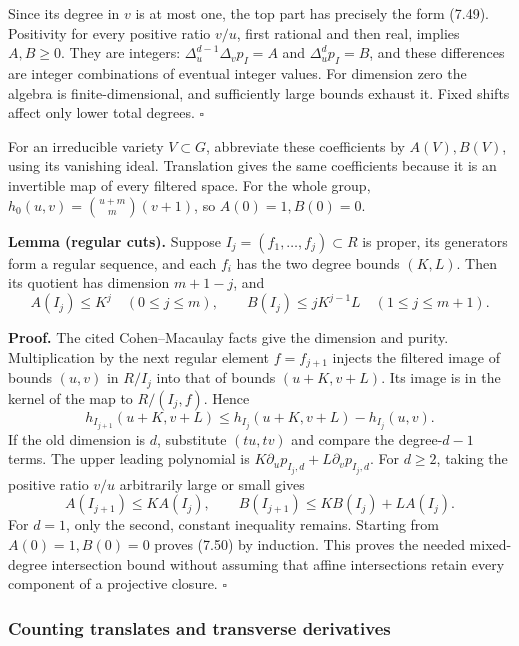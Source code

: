 \documentclass[
  11pt,
  a4paper,
]{article}
\begin{document}
Since its degree in \(v\) is at most one, the top part has precisely the
form (7.49). Positivity for every positive ratio \(v/u\), first rational
and then real, implies \(A,B\ge0\). They are integers:
\(\Delta_u^{d-1}\Delta_v p_I=A\) and \(\Delta_u^d p_I=B\), and these
differences are integer combinations of eventual integer values. For
dimension zero the algebra is finite-dimensional, and sufficiently large
bounds exhaust it. Fixed shifts affect only lower total degrees.
\(\square\)

For an irreducible variety \(V\subset G\), abbreviate these coefficients
by \(A(V),B(V)\), using its vanishing ideal. Translation gives the same
coefficients because it is an invertible map of every filtered space.
For the whole group, \(h_0(u,v)=\binom{u+m}{m}(v+1)\), so
\(A(0)=1,B(0)=0\).

\textbf{Lemma (regular cuts).} Suppose \(I_j=(f_1,\ldots,f_j)\subset R\)
is proper, its generators form a regular sequence, and each \(f_i\) has
the two degree bounds \((K,L)\). Then its quotient has dimension
\(m+1-j\), and \[
A(I_j)\le K^j\quad(0\le j\le m),\qquad
B(I_j)\le jK^{j-1}L\quad(1\le j\le m+1).
\tag{7.50}
\]

\textbf{Proof.} The cited Cohen--Macaulay facts give the dimension and
purity. Multiplication by the next regular element \(f=f_{j+1}\) injects
the filtered image of bounds \((u,v)\) in \(R/I_j\) into that of bounds
\((u+K,v+L)\). Its image is in the kernel of the map to \(R/(I_j,f)\).
Hence \[
h_{I_{j+1}}(u+K,v+L)
\le h_{I_j}(u+K,v+L)-h_{I_j}(u,v).
\] If the old dimension is \(d\), substitute \((tu,tv)\) and compare the
degree-\(d-1\) terms. The upper leading polynomial is
\(K\partial_u p_{I_j,d}+L\partial_v p_{I_j,d}\). For \(d\ge2\), taking
the positive ratio \(v/u\) arbitrarily large or small gives \[
A(I_{j+1})\le K A(I_j),\qquad
B(I_{j+1})\le K B(I_j)+L A(I_j).
\] For \(d=1\), only the second, constant inequality remains. Starting
from \(A(0)=1,B(0)=0\) proves (7.50) by induction. This proves the
needed mixed-degree intersection bound without assuming that affine
intersections retain every component of a projective closure.
\(\square\)

\subsubsection{Counting translates and transverse
derivatives}\label{counting-translates-and-transverse-derivatives}
\end{document}
